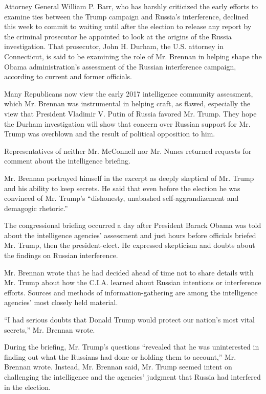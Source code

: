 Attorney General William P. Barr, who has harshly criticized the early
efforts to examine ties between the Trump campaign and Russia's
interference, declined this week to commit to waiting until after the
election to release any report by the criminal prosecutor he appointed
to look at the origins of the Russia investigation. That prosecutor,
John H. Durham, the U.S. attorney in Connecticut, is said to be
examining the role of Mr. Brennan in helping shape the Obama
administration's assessment of the Russian interference campaign,
according to current and former officials.

Many Republicans now view the early 2017 intelligence community
assessment, which Mr. Brennan was instrumental in helping craft, as
flawed, especially the view that President Vladimir V. Putin of Russia
favored Mr. Trump. They hope the Durham investigation will show that
concern over Russian support for Mr. Trump was overblown and the result
of political opposition to him.

Representatives of neither Mr. McConnell nor Mr. Nunes returned requests
for comment about the intelligence briefing.

Mr. Brennan portrayed himself in the excerpt as deeply skeptical of Mr.
Trump and his ability to keep secrets. He said that even before the
election he was convinced of Mr. Trump's ``dishonesty, unabashed
self-aggrandizement and demagogic rhetoric.''

The congressional briefing occurred a day after President Barack Obama
was told about the intelligence agencies' assessment and just hours
before officials briefed Mr. Trump, then the president-elect. He
expressed skepticism and doubts about the findings on Russian
interference.

Mr. Brennan wrote that he had decided ahead of time not to share details
with Mr. Trump about how the C.I.A. learned about Russian intentions or
interference efforts. Sources and methods of information-gathering are
among the intelligence agencies' most closely held material.

``I had serious doubts that Donald Trump would protect our nation's most
vital secrets,'' Mr. Brennan wrote.

During the briefing, Mr. Trump's questions ``revealed that he was
uninterested in finding out what the Russians had done or holding them
to account,'' Mr. Brennan wrote. Instead, Mr. Brennan said, Mr. Trump
seemed intent on challenging the intelligence and the agencies' judgment
that Russia had interfered in the election.

